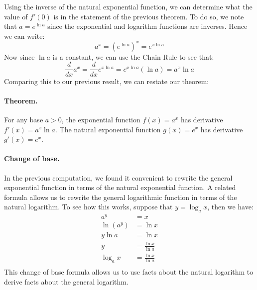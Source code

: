 \documentclass[12pt]{report}
\begin{document}
\begin{center}
\end{center}

Using the inverse of the natural exponential function, we can determine what the value of $f'(0)$ is in the statement of the previous theorem. To do so, we note that $a=e^{\ln a}$ since the exponential and logarithm functions are inverses. Hence we can write: \[a^x=\left(e^{\ln a}\right)^x=e^{x\ln a}\] Now since $\ln a$ is a constant, we can use the Chain Rule to see that: \[\frac d{dx} a^x=\frac d{dx} e^{x\ln a} =e^{x\ln a}(\ln a) =a^x\ln a\] Comparing this to our previous result, we can restate our theorem:

\paragraph{Theorem.} For any base $a>0$, the exponential function $f(x)=a^x$ has derivative $f'(x)=a^x\ln a$. The natural exponential function $g(x)=e^x$ has derivative $g'(x)=e^x$.

\paragraph{Change of base.} In the previous computation, we found it convenient to rewrite the general exponential function in terms of the natural exponential function. A related formula allows us to rewrite the general logarithmic function in terms of the natural logarithm.  To see how this works, suppose that $y=\log_ax$, then we have:
\begin{equation*}
\begin{split}
a^y&=x \\
\ln(a^y)&=\ln x\\
y\ln a&=\ln x\\
y&=\frac{\ln x}{\ln a}\\
\log_a x&=\frac{\ln x}{\ln a}\\
\end{split}
\end{equation*}
This change of base formula allows us to use facts about the natural logarithm to derive facts about the general logarithm.
\end{document}

